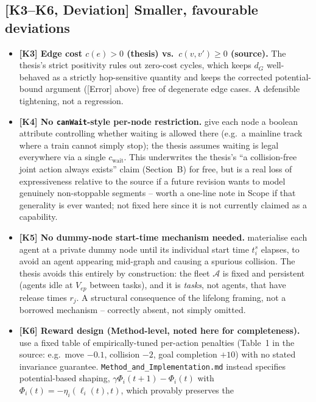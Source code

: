 \documentclass[11pt]{article}
\begin{document}
\subsection{[K3--K6, Deviation] Smaller, favourable deviations}
\begin{itemize}
  \item \textbf{[K3] Edge cost $c(e) > 0$ (thesis) vs.\ $c(v,v') \ge 0$
    (source).} The thesis's strict positivity rules out zero-cost cycles,
    which keeps $d_G$ well-behaved as a strictly hop-sensitive quantity and
    keeps the corrected potential-bound argument ([Error] above) free of
    degenerate edge cases. A defensible tightening, not a regression.
  \item \textbf{[K4] No \texttt{canWait}-style per-node restriction.}
    \citeauthor{knippenberg2021} give each node a boolean attribute
    controlling whether waiting is allowed there (e.g.\ a mainline track
    where a train cannot simply stop); the thesis assumes waiting is legal
    everywhere via a single $c_{\mathrm{wait}}$. This underwrites the
    thesis's ``a collision-free joint action always exists'' claim
    (Section~B) for free, but is a real loss of expressiveness relative to
    the source if a future revision wants to model genuinely
    non-stoppable segments -- worth a one-line note in Scope if that
    generality is ever wanted; not fixed here since it is not currently
    claimed as a capability.
  \item \textbf{[K5] No dummy-node start-time mechanism needed.}
    \citeauthor{knippenberg2021} materialise each agent at a private dummy
    node until its individual start time $t_i^s$ elapses, to avoid an agent
    appearing mid-graph and causing a spurious collision. The thesis avoids
    this entirely by construction: the fleet $\mathcal{A}$ is fixed and
    persistent (agents idle at $V_{ep}$ between tasks), and it is
    \emph{tasks}, not agents, that have release times $r_j$. A structural
    consequence of the lifelong framing, not a borrowed mechanism -- correctly
    absent, not simply omitted.
  \item \textbf{[K6] Reward design (Method-level, noted here for
    completeness).} \citeauthor{knippenberg2021} use a fixed table of
    empirically-tuned per-action penalties (Table~1 in the source: e.g.\
    move $-0.1$, collision $-2$, goal completion $+10$) with no stated
    invariance guarantee. \texttt{Method\_and\_Implementation.md} instead
    specifies potential-based shaping, $\gamma\Phi_i(t{+}1)-\Phi_i(t)$ with
    $\Phi_i(t) = -\eta_i(\ell_i(t),t)$, which provably preserves the

\end{itemize}
\end{document}
